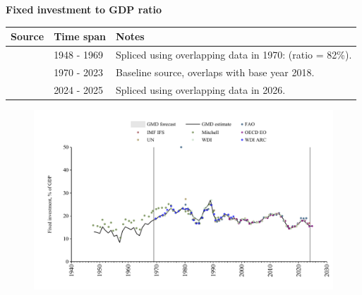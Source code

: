 \documentclass[12pt,a4paper,landscape]{article}
\begin{document}
\begin{adjustbox}{max totalsize={\paperwidth}{\paperheight},center}
\begin{minipage}[t][\textheight][t]{\textwidth}
\vspace*{0.5cm}
{}
\begin{center}
{\Large\bfseries Fixed investment to GDP ratio}
\end{center}
\vspace{0.5cm}
\begin{table}[H]
\centering
\small
\begin{tabular}{|l|l|l|}
\hline
\textbf{Source} & \textbf{Time span} & \textbf{Notes} \\
\hline
\rowcolor{white}\cite{Mitchell}& 1948 - 1969 &Spliced using overlapping data in 1970: (ratio = 82\%). \\
\rowcolor{lightgray}\cite{WDI}& 1970 - 2023 &Baseline source, overlaps with base year 2018. \\
\rowcolor{white}\cite{OECD_EO}& 2024 - 2025 &Spliced using overlapping data in 2026. \\
\hline
\end{tabular}
\end{table}
\begin{figure}[H]
\centering
\includegraphics[width=\textwidth,height=0.6\textheight,keepaspectratio]{graphs/BRA_finv_GDP.pdf}
\end{figure}
\end{minipage}
\end{adjustbox}
\end{document}
